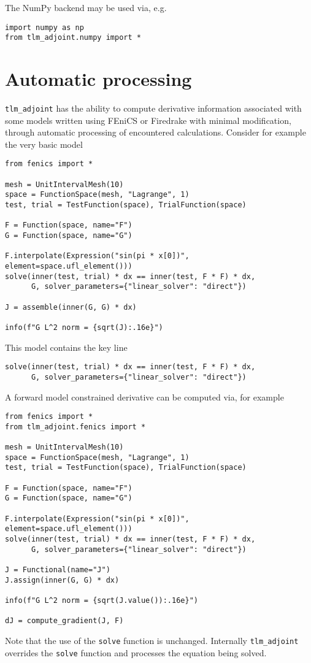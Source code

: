 \documentclass[11pt]{article}
\begin{document}
The NumPy backend may be used via, e.g.
\begin{lstlisting}
import numpy as np
from tlm_adjoint.numpy import *
\end{lstlisting}

\section{Automatic processing}\label{sect:overrides}

\texttt{tlm\_adjoint} has the ability to compute derivative information
associated with some models written using FEniCS or Firedrake with minimal
modification, through automatic processing of encountered calculations.
Consider for example the very basic model
\begin{lstlisting}
from fenics import *

mesh = UnitIntervalMesh(10)
space = FunctionSpace(mesh, "Lagrange", 1)
test, trial = TestFunction(space), TrialFunction(space)

F = Function(space, name="F")
G = Function(space, name="G")

F.interpolate(Expression("sin(pi * x[0])", element=space.ufl_element()))
solve(inner(test, trial) * dx == inner(test, F * F) * dx,
      G, solver_parameters={"linear_solver": "direct"})

J = assemble(inner(G, G) * dx)

info(f"G L^2 norm = {sqrt(J):.16e}")
\end{lstlisting}
This model contains the key line
\begin{lstlisting}
solve(inner(test, trial) * dx == inner(test, F * F) * dx,
      G, solver_parameters={"linear_solver": "direct"})
\end{lstlisting}

A forward model constrained derivative can be computed via, for example
\begin{lstlisting}
from fenics import *
from tlm_adjoint.fenics import *

mesh = UnitIntervalMesh(10)
space = FunctionSpace(mesh, "Lagrange", 1)
test, trial = TestFunction(space), TrialFunction(space)

F = Function(space, name="F")
G = Function(space, name="G")

F.interpolate(Expression("sin(pi * x[0])", element=space.ufl_element()))
solve(inner(test, trial) * dx == inner(test, F * F) * dx,
      G, solver_parameters={"linear_solver": "direct"})

J = Functional(name="J")
J.assign(inner(G, G) * dx)

info(f"G L^2 norm = {sqrt(J.value()):.16e}")

dJ = compute_gradient(J, F)
\end{lstlisting}
Note that the use of the \texttt{solve} function is unchanged. Internally
\texttt{tlm\_adjoint} overrides the \texttt{solve} function and processes the
equation being solved.
\end{document}
